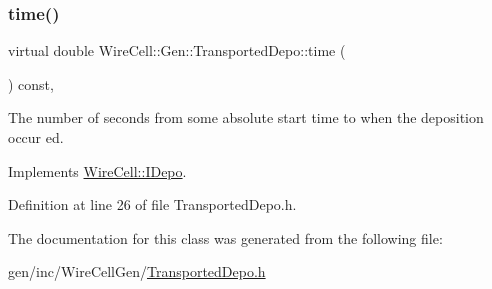 \mbox{\label{class_wire_cell_1_1_gen_1_1_transported_depo_aa4f72056a68d1484c8d84fb27b3acacf}} 
\subsubsection{\texorpdfstring{time()}{time()}}
{\footnotesize\ttfamily virtual double Wire\+Cell\+::\+Gen\+::\+Transported\+Depo\+::time (\begin{DoxyParamCaption}{ }\end{DoxyParamCaption}) const\hspace{0.3cm}{\ttfamily [inline]}, {\ttfamily [virtual]}}

The number of seconds from some absolute start time to when the deposition occur ed. 

Implements \hyperlink{class_wire_cell_1_1_i_depo_abec395a8a8335d76ae07db2baf57ed83}{Wire\+Cell\+::\+I\+Depo}.



Definition at line 26 of file Transported\+Depo.\+h.



The documentation for this class was generated from the following file\+:\begin{DoxyCompactItemize}
\item 
gen/inc/\+Wire\+Cell\+Gen/\hyperlink{_transported_depo_8h}{Transported\+Depo.\+h}\end{DoxyCompactItemize}
